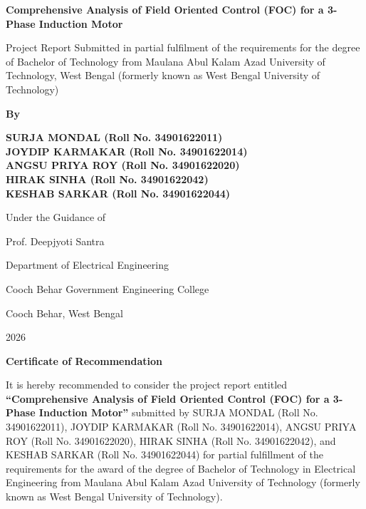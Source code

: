 \documentclass[12pt,a4paper]{report}
\begin{document}
\begin{titlepage}
\begin{center}
{\fontsize{28}{34}\selectfont\bfseries Comprehensive Analysis of Field Oriented Control (FOC) for a 3-Phase Induction Motor\par}
\vspace{1.5cm}
{\fontsize{14}{17}\selectfont Project Report Submitted in partial fulfilment of the requirements for the degree of Bachelor of Technology from Maulana Abul Kalam Azad University of Technology, West Bengal (formerly known as West Bengal University of Technology)\par}
\vspace{1.5cm}
{\Large \bfseries By\par}
\vspace{0.5cm}
{\fontsize{18}{22}\selectfont\bfseries
SURJA MONDAL (Roll No. 34901622011)\\
JOYDIP KARMAKAR (Roll No. 34901622014)\\
ANGSU PRIYA ROY (Roll No. 34901622020)\\
HIRAK SINHA (Roll No. 34901622042)\\
KESHAB SARKAR (Roll No. 34901622044)\par}
\vspace{1.5cm}
{\fontsize{16}{19}\selectfont Under the Guidance of\par}
\vspace{0.5cm}
{\fontsize{16}{19}\selectfont Prof. Deepjyoti Santra\par}
\vfill
{\Large Department of Electrical Engineering\par}
{\Large Cooch Behar Government Engineering College\par}
{\Large Cooch Behar, West Bengal\par}
{\Large 2026\par}
\end{center}
\end{titlepage}

\newpage
\begin{center}
{\Large \bfseries Certificate of Recommendation\par}
\end{center}
\vspace{1cm}
It is hereby recommended to consider the project report entitled \textbf{``Comprehensive Analysis of Field Oriented Control (FOC) for a 3-Phase Induction Motor''} submitted by SURJA MONDAL (Roll No. 34901622011), JOYDIP KARMAKAR (Roll No. 34901622014), ANGSU PRIYA ROY (Roll No. 34901622020), HIRAK SINHA (Roll No. 34901622042), and KESHAB SARKAR (Roll No. 34901622044) for partial fulfillment of the requirements for the award of the degree of Bachelor of Technology in Electrical Engineering from Maulana Abul Kalam Azad University of Technology (formerly known as West Bengal University of Technology).
\vspace{3cm}
\end{document}
